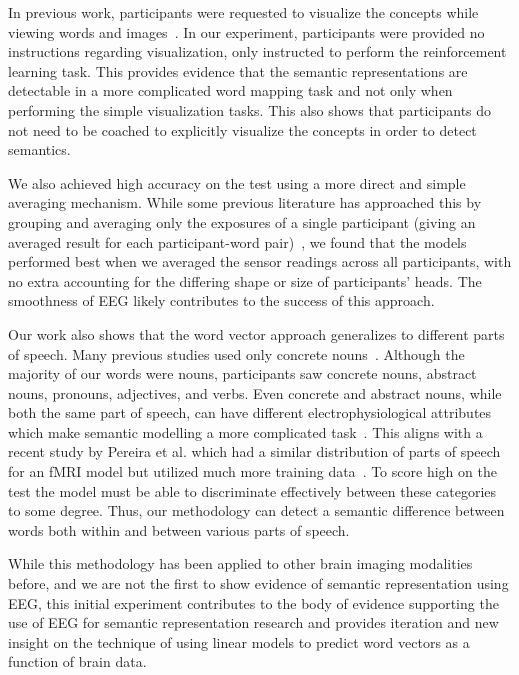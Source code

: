 In previous work, participants were requested to visualize the concepts while 
viewing words and images~\cite{Mitchell2008,Sudre2012}. In our experiment, 
participants were provided no instructions regarding visualization, only 
instructed to perform the reinforcement learning task. This provides evidence 
that the semantic representations are detectable in a more complicated word 
mapping task and not only when performing the simple visualization tasks. This 
also shows that participants do not need to be coached to explicitly visualize 
the concepts in order to detect semantics.

We also achieved high accuracy on the \tvt test using a more direct and simple 
averaging mechanism. While some previous literature has approached this by 
grouping and averaging only the exposures of a single participant (giving an 
averaged result for each participant-word pair)~\cite{Mitchell2008,Sudre2012}, 
we found that the models performed best when we averaged the sensor readings 
across all participants, with no extra accounting for the differing shape or 
size of participants' heads. The smoothness of EEG likely contributes to the 
success of this approach.

Our work also shows that the word vector approach generalizes to different 
parts of speech. Many previous studies used only concrete 
nouns~\cite{Mitchell2008,Sudre2012,Murphy2009}. Although the majority of our 
words were nouns, participants saw concrete nouns, abstract nouns, pronouns, 
adjectives, and verbs. Even concrete and abstract nouns, while both the same 
part of speech, can have different electrophysiological attributes which make 
semantic modelling a more complicated task~\cite{barber2013concreteness}. This 
aligns with a recent study by Pereira et al. which had a similar distribution 
of parts of speech for an fMRI model but utilized much more training 
data~\cite{pereira2018toward}. To score high on the \tvt test the model must be 
able to discriminate effectively between these categories to some degree. Thus, 
our methodology can detect a semantic difference between words both within and 
between various parts of speech.

While this methodology has been applied to other brain imaging modalities 
before, and we are not the first to show evidence of semantic representation 
using EEG, this initial experiment contributes to the body of evidence 
supporting the use of EEG for semantic representation research and provides 
iteration and new insight on the technique of using linear models to predict 
word vectors as a function of brain data.

